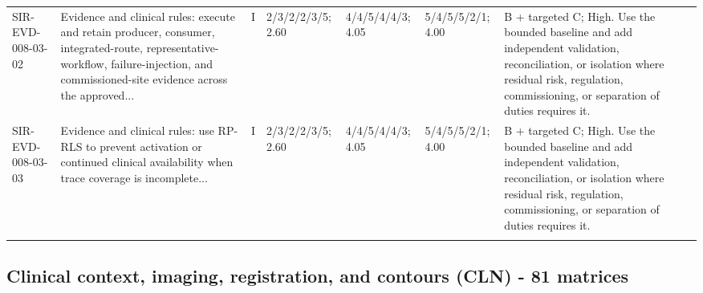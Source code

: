 \documentclass[11pt,letterpaper]{article}
\begin{document}
\begin{scriptsize}
\begin{longtable}{@{}L{0.11\textwidth}L{0.165\textwidth}L{0.04\textwidth}L{0.115\textwidth}L{0.115\textwidth}L{0.115\textwidth}L{0.235\textwidth}@{}}
\addlinespace[2pt]
SIR-EVD-008-03-02 & Evidence and clinical rules: execute and retain producer, consumer, integrated-route, representative-workflow, failure-injection, and commissioned-site evidence across the approved... & I & 2/3/2/2/3/5; 2.60 & 4/4/5/4/4/3; 4.05 & 5/4/5/5/2/1; 4.00 & B + targeted C; High. Use the bounded baseline and add independent validation, reconciliation, or isolation where residual risk, regulation, commissioning, or separation of duties requires it. \\
\addlinespace[2pt]
SIR-EVD-008-03-03 & Evidence and clinical rules: use RP-RLS to prevent activation or continued clinical availability when trace coverage is incomplete... & I & 2/3/2/2/3/5; 2.60 & 4/4/5/4/4/3; 4.05 & 5/4/5/5/2/1; 4.00 & B + targeted C; High. Use the bounded baseline and add independent validation, reconciliation, or isolation where residual risk, regulation, commissioning, or separation of duties requires it. \\
\addlinespace[2pt]
\end{longtable}
\end{scriptsize}

\subsection{Clinical context, imaging, registration, and contours (CLN) - 81 matrices}
\end{document}
